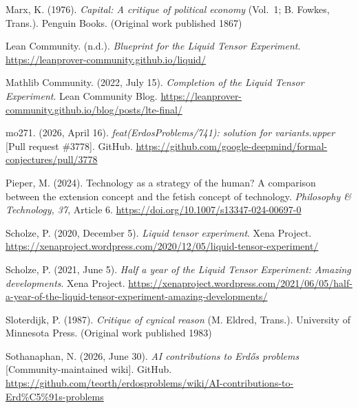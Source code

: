 \documentclass[pdflatex,sn-apa]{sn-jnl}
\begin{document}
\noindent\hangindent=0.5in Marx, K. (1976). \emph{Capital: A critique of political economy} (Vol.~1; B. Fowkes, Trans.). Penguin Books. (Original work published 1867)\par\medskip

\noindent\hangindent=0.5in Lean Community. (n.d.). \emph{Blueprint for the Liquid Tensor Experiment}. \url{https://leanprover-community.github.io/liquid/}\par\medskip

\noindent\hangindent=0.5in Mathlib Community. (2022, July 15). \emph{Completion of the Liquid Tensor Experiment}. Lean Community Blog. \url{https://leanprover-community.github.io/blog/posts/lte-final/}\par\medskip

\noindent\hangindent=0.5in mo271. (2026, April 16). \emph{feat(ErdosProblems/741): solution for variants.upper} [Pull request \#3778]. GitHub. \url{https://github.com/google-deepmind/formal-conjectures/pull/3778}\par\medskip

\noindent\hangindent=0.5in Pieper, M. (2024). Technology as a strategy of the human? A comparison between the extension concept and the fetish concept of technology. \emph{Philosophy \& Technology, 37}, Article 6. \url{https://doi.org/10.1007/s13347-024-00697-0}\par\medskip

\noindent\hangindent=0.5in Scholze, P. (2020, December 5). \emph{Liquid tensor experiment}. Xena Project. \url{https://xenaproject.wordpress.com/2020/12/05/liquid-tensor-experiment/}\par\medskip

\noindent\hangindent=0.5in Scholze, P. (2021, June 5). \emph{Half a year of the Liquid Tensor Experiment: Amazing developments}. Xena Project. \url{https://xenaproject.wordpress.com/2021/06/05/half-a-year-of-the-liquid-tensor-experiment-amazing-developments/}\par\medskip

\noindent\hangindent=0.5in Sloterdijk, P. (1987). \emph{Critique of cynical reason} (M. Eldred, Trans.). University of Minnesota Press. (Original work published 1983)\par\medskip

\noindent\hangindent=0.5in Sothanaphan, N. (2026, June 30). \emph{AI contributions to Erdős problems} [Community-maintained wiki]. GitHub. \url{https://github.com/teorth/erdosproblems/wiki/AI-contributions-to-Erd%C5%91s-problems}\par\medskip
\end{document}
